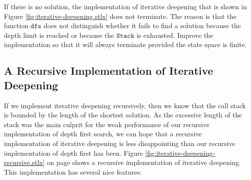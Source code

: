 \exercise 
If there is no solution, the implementation of iterative deepening that is shown in Figure
\ref{fig:iterative-deepening.stlx} does not terminate.  The reason is that the function $\mathtt{dfs}$ does not
distinguish whether it fails to find a solution because the depth limit is reached or because the $\mathtt{Stack}$ is
exhausted.  Improve the implementation so that it will always terminate provided the state space is finite.

\subsection{A Recursive Implementation of Iterative Deepening}
If we implement iterative deepening recursively, then we know that the call stack is bounded by the length of
the shortest solution.  As the excessive length of the stack was the main culprit for the weak performance of
our recursive implementation of depth first search, we can hope that a recursive implementation of iterative
deepening is less disappointing than our recursive implementation of depth first has been.
Figure \ref{fig:iterative-deepening-recursive.stlx} on page \pageref{fig:iterative-deepening-recursive.stlx}
shows a recursive implementation of iterative deepening.  This implementation has several nice features:


